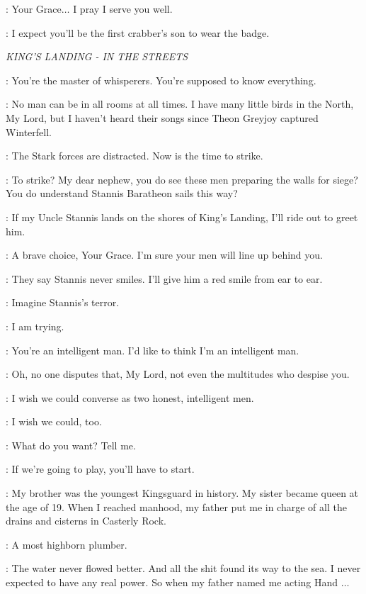 \DAVOS: Your Grace$\ldots$ I pray I serve you well. 

\STANNIS: I expect you'll be the first crabber's son to wear the badge. 


\scene

\textit{KING'S LANDING - IN THE STREETS} 


\JOFFREY: You're the master of whisperers. You're supposed to know everything. 

\VARYS: No man can be in all rooms at all times. I have many little birds in the North, My Lord, but I haven't heard their songs since Theon Greyjoy captured Winterfell. 

\JOFFREY: The Stark forces are distracted. Now is the time to strike. 

\TYRION: To strike? My dear nephew, you do see these men preparing the walls for siege? You do understand Stannis Baratheon sails this way? 

\JOFFREY: If my Uncle Stannis lands on the shores of King's Landing, I'll ride out to greet him. 

\TYRION: A brave choice, Your Grace. I'm sure your men will line up behind you. 

\JOFFREY: They say Stannis never smiles. I'll give him a red smile from ear to ear. 


\TYRION: Imagine Stannis's terror. 

\VARYS: I am trying. 

\TYRION: You're an intelligent man. I'd like to think I'm an intelligent man. 

\VARYS: Oh, no one disputes that, My Lord, not even the multitudes who despise you. 

\TYRION: I wish we could converse as two honest, intelligent men. 

\VARYS: I wish we could, too. 

\TYRION: What do you want? Tell me. 

\VARYS: If we're going to play, you'll have to start. 

\TYRION: My brother was the youngest Kingsguard in history. My sister became queen at the age of 19. When I reached manhood, my father put me in charge of all the drains and cisterns in Casterly Rock. 

\VARYS: A most highborn plumber. 

\TYRION: The water never flowed better. And all the shit found its way to the sea. I never expected to have any real power. So when my father named me acting Hand $\ldots$  

